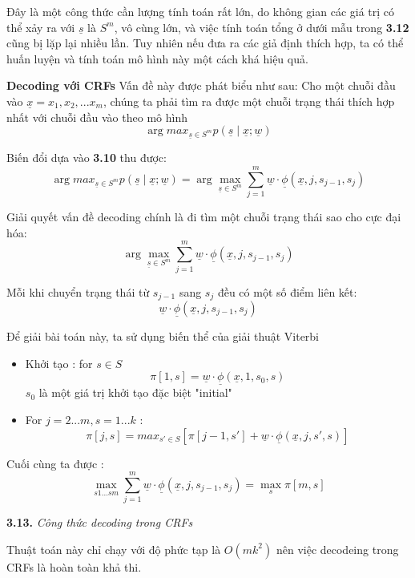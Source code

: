 Đây là một công thức cần lượng tính toán rất lớn, do không gian các giá trị có thể xảy ra với $\underline{s}$ là $S^m$, vô cùng lớn, và việc tính toán tổng ở dưới mẫu trong \textbf{3.12} cũng bị lặp lại nhiều lần. Tuy nhiên nếu đưa ra các giả định thích hợp, ta có thể huấn luyện và tính toán mô hình này một cách khá hiệu quả.

\vspace{0.3cm}
\textbf{Decoding với CRFs} Vấn đề này được phát biểu như sau: Cho một chuỗi đầu vào $\underline{x} = x_1, x_2, ... x_m$, chúng ta phải tìm ra được một chuỗi trạng thái thích hợp nhất với chuỗi đầu vào theo mô hình 
$$\arg max_{\underline{s} \in S^m} p(\underline{s}\mid \underline{x}; \underline{w})$$

Biến đổi dựa vào \textbf{3.10} thu được:
$$\arg max_{\underline{s} \in S^m} p(\underline{s}\mid \underline{x}; \underline{w}) = \arg \max_{\underline{s} \in S^m} \sum_{j=1}^m \underline{w} \cdot \underline{\phi}(\underline{x},j,s_{j-1},s_j)$$

Giải quyết vấn đề decoding chính là đi tìm một chuỗi trạng thái sao cho cực đại hóa:
$$\arg \max_{\underline{s} \in S^m} \sum_{j=1}^m \underline{w} \cdot \underline{\phi}(\underline{x},j,s_{j-1},s_j)$$

Mỗi khi chuyển trạng thái từ $s_{j-1}$ sang $s_j$ đều có một số điểm liên kết:
$$\underline{w} \cdot \underline{\phi}(\underline{x},j,s_{j-1},s_j)$$

Để giải bài toán này, ta sử dụng biến thể của giải thuật Viterbi
\begin{itemize}
    \item Khởi tạo : for $s \in S$
    $$\pi[1,s] = \underline{w} \cdot \underline{\phi}(\underline{x},1,s_0,s)$$
    $s_0$ là một giá trị khởi tạo đặc biệt "initial"
    \item For $j = 2 ... m, s = 1 ... k$ :
    $$\pi[j,s] = max_{s' \in S}[\pi [j-1,s'] + \underline{w} \cdot \underline{\phi}(\underline{x},j,s',s)]$$
\end{itemize}

Cuối cùng ta được :
$$ \max_{s1 ... sm} \sum_{j=1}^m \underline{w} \cdot \underline{\phi}(\underline{x},j,s_{j-1},s_j) = \max_{s}\pi[m,s]$$
\begin{center}

\vspace{0.1cm}
\textbf{3.13.} \textit{Công thức decoding trong CRFs}    
\end{center}

Thuật toán này chỉ chạy với độ phức tạp là $O(mk^2)$ nên việc decodeing trong CRFs là hoàn toàn khả thi.

